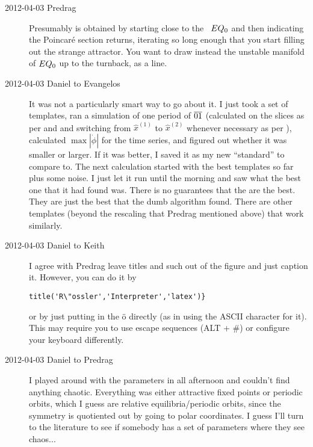 \begin{description}
\item[2012-04-03 Predrag] Presumably  is obtained
by starting close to the \eqv\ $EQ_{0}$ and then indicating the
Poincar\'e section returns, iterating so long enough that you start
filling out the strange attractor. You want to draw instead the unstable
manifold of $EQ_{0}$ up to the turnback, as a line.

\item[2012-04-03 Daniel to Evangelos]
It was not a particularly smart way to go about it. I just took a set of
templates, ran a simulation of one period of $\overline{01}$ (calculated
on the slices as per  and   and
switching from $\hat{x}^{(1)}$ to $\hat{x}^{(2)}$ whenever necessary as
per ), calculated $\max |\dot{\phi}|$ for the time
series, and figured out whether it was smaller or larger. If it was
better, I saved it as my new ``standard'' to compare to. The next
calculation started with the best templates so far plus some noise. I
just let it run until the morning and saw what the best one that it had
found was. There is no guarantees that the are the best. They are just
the best that the dumb algorithm found. There are other templates (beyond
the rescaling that Predrag mentioned above) that work similarly.

\item[2012-04-03 Daniel to Keith] I agree with Predrag leave titles and
such out of the figure and just caption it. However, you can do it by
\begin{verbatim}
title('R\"ossler','Interpreter','latex')}
\end{verbatim}
or by just putting in the \"o directly (as in using the
ASCII character for it). This may require you to use escape sequences
(ALT + \#) or configure your keyboard differently.

\item[2012-04-03 Daniel to Predrag] I played around with the parameters
in  all afternoon and couldn't find anything chaotic.
Everything was either attractive fixed points or periodic orbits, which I
guess are relative equilibria/periodic orbits, since the symmetry is
quotiented out by going to polar coordinates. I guess I'll turn to the
literature to see if somebody has a set of parameters where they see
chaos...


\end{description}
